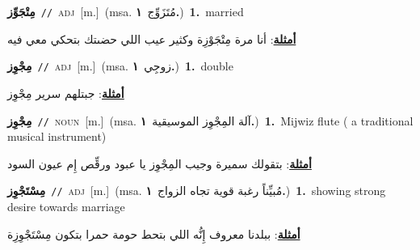 \documentclass[10pt,a4paper,twoside]{article} %
\begin{document}
\begin{multicols}{2}
{\setlength\topsep{0pt}\textbf{\foreignlanguage{arabic}{مِتْجَوِّز}}\ {\color{gray}\texttt{//}\color{black}}\ \textsc{adj}\ [m.]\ \color{gray}(msa. \foreignlanguage{arabic}{مُتَزَوِّج}~\foreignlanguage{arabic}{\textbf{١.}})\color{black}\ \textbf{1.}~married\  \begin{flushright}\color{gray}\foreignlanguage{arabic}{\textbf{\underline{\foreignlanguage{arabic}{أمثلة}}}: أنا مرة مِتْجَوْزِة وكثير عيب اللي حضىتك بتحكي معي فيه}\end{flushright}\color{black}} \vspace{2mm}

{\setlength\topsep{0pt}\textbf{\foreignlanguage{arabic}{مِجْوِز}}\ {\color{gray}\texttt{//}\color{black}}\ \textsc{adj}\ [m.]\ \color{gray}(msa. \foreignlanguage{arabic}{زوجِي}~\foreignlanguage{arabic}{\textbf{١.}})\color{black}\ \textbf{1.}~double\  \begin{flushright}\color{gray}\foreignlanguage{arabic}{\textbf{\underline{\foreignlanguage{arabic}{أمثلة}}}: جبتلهم سرير مِجْوِز}\end{flushright}\color{black}} \vspace{2mm}

{\setlength\topsep{0pt}\textbf{\foreignlanguage{arabic}{مِجْوِز}}\ {\color{gray}\texttt{//}\color{black}}\ \textsc{noun}\ [m.]\ \color{gray}(msa. \foreignlanguage{arabic}{آلة المِجْوِز الموسيقية}~\foreignlanguage{arabic}{\textbf{١.}})\color{black}\ \textbf{1.}~Mijwiz flute ( a traditional musical instrument)\  \begin{flushright}\color{gray}\foreignlanguage{arabic}{\textbf{\underline{\foreignlanguage{arabic}{أمثلة}}}: بتقولك سميرة وجيب المِجْوِز يا عبود ورقِّص إِم عيون السود}\end{flushright}\color{black}} \vspace{2mm}

{\setlength\topsep{0pt}\textbf{\foreignlanguage{arabic}{مِسْتَجْوِز}}\ {\color{gray}\texttt{//}\color{black}}\ \textsc{adj}\ [m.]\ \color{gray}(msa. \foreignlanguage{arabic}{مُبيِّناً رغبة قوية تجاه الزواج}~\foreignlanguage{arabic}{\textbf{١.}})\color{black}\ \textbf{1.}~showing strong desire towards marriage\  \begin{flushright}\color{gray}\foreignlanguage{arabic}{\textbf{\underline{\foreignlanguage{arabic}{أمثلة}}}: ببلدنا معروف إِنُّه اللي بتحط حومة حمرا بتكون مِسْتَجْوِزِة}\end{flushright}\color{black}} \vspace{2mm}


\end{multicols}
\end{document}
